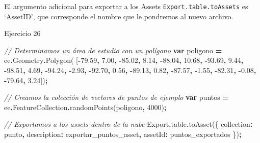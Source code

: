 \documentclass[
  12pt,
  letterpaper,
  twoside]{book}
\newenvironment{Shaded}{\begin{snugshade}}{\end{snugshade}}
\newcommand{\AttributeTok}[1]{\textcolor[rgb]{0.77,0.63,0.00}{#1}}
\newcommand{\CommentTok}[1]{\textcolor[rgb]{0.56,0.35,0.01}{\textit{#1}}}
\newcommand{\DataTypeTok}[1]{\textcolor[rgb]{0.13,0.29,0.53}{#1}}
\newcommand{\DecValTok}[1]{\textcolor[rgb]{0.00,0.00,0.81}{#1}}
\newcommand{\FloatTok}[1]{\textcolor[rgb]{0.00,0.00,0.81}{#1}}
\newcommand{\FunctionTok}[1]{\textcolor[rgb]{0.00,0.00,0.00}{#1}}
\newcommand{\KeywordTok}[1]{\textcolor[rgb]{0.13,0.29,0.53}{\textbf{#1}}}
\newcommand{\NormalTok}[1]{#1}
\newcommand{\OperatorTok}[1]{\textcolor[rgb]{0.81,0.36,0.00}{\textbf{#1}}}
\newcommand{\StringTok}[1]{\textcolor[rgb]{0.31,0.60,0.02}{#1}}
\begin{document}
El argumento adicional para exportar a los Assets \texttt{Export.table.toAssets} es `AssetID', que corresponde el nombre que le pondremos al nuevo archivo.

Ejercicio 26

\begin{Shaded}
\begin{Highlighting}[]
\CommentTok{// Determinamos un área de estudio con un polígono}
\KeywordTok{var}\NormalTok{ poligono }\OperatorTok{=}\NormalTok{ ee}\OperatorTok{.}\AttributeTok{Geometry}\OperatorTok{.}\FunctionTok{Polygon}\NormalTok{(}
\NormalTok{        [}\OperatorTok{{-}}\FloatTok{79.59}\OperatorTok{,} \FloatTok{7.00}\OperatorTok{,}
          \OperatorTok{{-}}\FloatTok{85.02}\OperatorTok{,} \FloatTok{8.14}\OperatorTok{,}
          \OperatorTok{{-}}\FloatTok{88.04}\OperatorTok{,} \FloatTok{10.68}\OperatorTok{,}
          \OperatorTok{{-}}\FloatTok{93.69}\OperatorTok{,} \FloatTok{9.44}\OperatorTok{,}
          \OperatorTok{{-}}\FloatTok{98.51}\OperatorTok{,} \FloatTok{4.69}\OperatorTok{,}
          \OperatorTok{{-}}\FloatTok{94.24}\OperatorTok{,} \OperatorTok{{-}}\FloatTok{2.93}\OperatorTok{,}
          \OperatorTok{{-}}\FloatTok{92.70}\OperatorTok{,} \FloatTok{0.56}\OperatorTok{,}
          \OperatorTok{{-}}\FloatTok{89.13}\OperatorTok{,} \FloatTok{0.82}\OperatorTok{,}
          \OperatorTok{{-}}\FloatTok{87.57}\OperatorTok{,} \OperatorTok{{-}}\FloatTok{1.55}\OperatorTok{,}
          \OperatorTok{{-}}\FloatTok{82.31}\OperatorTok{,} \OperatorTok{{-}}\FloatTok{0.08}\OperatorTok{,}
          \OperatorTok{{-}}\FloatTok{79.64}\OperatorTok{,} \FloatTok{3.24}\NormalTok{])}\OperatorTok{;}

\CommentTok{// Creamos la colección de vectores de puntos de ejemplo}
\KeywordTok{var}\NormalTok{ puntos }\OperatorTok{=}\NormalTok{ ee}\OperatorTok{.}\AttributeTok{FeatureCollection}\OperatorTok{.}\FunctionTok{randomPoints}\NormalTok{(poligono}\OperatorTok{,} \DecValTok{4000}\NormalTok{)}\OperatorTok{;}

\CommentTok{// Exportamos a los assets dentro de la nube}
\NormalTok{Export}\OperatorTok{.}\AttributeTok{table}\OperatorTok{.}\FunctionTok{toAsset}\NormalTok{(\{}
  \DataTypeTok{collection}\OperatorTok{:}\NormalTok{ punto}\OperatorTok{,}
  \DataTypeTok{description}\OperatorTok{:} \StringTok{\textquotesingle{}exportar\_puntos\_asset\textquotesingle{}}\OperatorTok{,}
  \DataTypeTok{assetId}\OperatorTok{:} \StringTok{\textquotesingle{}puntos\_exportados\textquotesingle{}}
\NormalTok{\})}\OperatorTok{;}


\end{Highlighting}
\end{Shaded}
\end{document}
